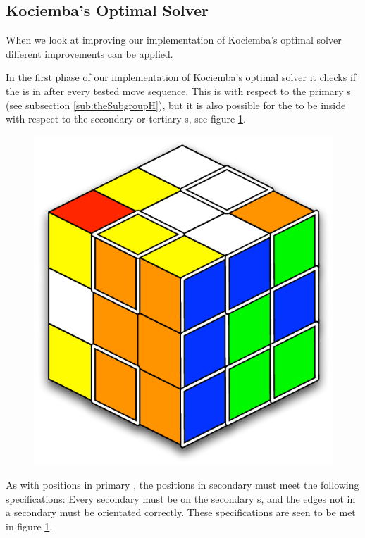 \subsection{Kociemba's Optimal Solver}
When we look at improving our implementation of Kociemba's optimal solver different improvements can be applied.
	
In the first phase of our implementation of Kociemba's optimal solver it checks if the \cube{} is in  after every tested move sequence.
This  is with respect to the primary \face{}s (see subsection \ref{sub:theSubgroupH}), but it is also possible for the \rubik{} to be inside  with respect to the secondary or tertiary \face{}s, see figure \ref{fig:secondaryH}.

\begin{figure}[htb]
	\centering
	\includegraphics[scale=0.75]{input/pics/secondaryH.pdf}
	\caption{}
	\label{fig:secondaryH}
\end{figure}

As with positions in primary , the positions in secondary  must meet the following specifications:
Every secondary \facelet{} must be on the secondary \face{}s, and the edges not in a secondary \face{} must be orientated correctly.
These specifications are seen to be met in figure \ref{fig:secondaryH}.

